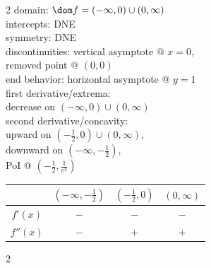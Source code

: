 \documentclass{book}
\begin{document}
\begin{appendices}
\begin{enumerate}[!HW!]
\begin{multicols}{2}
domain: $\dom f = (-\infty, 0) \cup (0, \infty)$ \\
intercepts: DNE\\
symmetry: DNE\\ 
discontinuities: vertical asymptote @ $x=0$,\\ removed point @ $(0,0)$\\
end behavior: horizontal asymptote @ $y=1$\\
first derivative/extrema:\\ decrease on $(-\infty, 0)\cup(0,\infty)$\\
second derivative/concavity:\\ upward on $\left(-\frac{1}{2}, 0\right)\cup(0,\infty)$,\\ downward on $\left(-\infty, -\frac{1}{2}\right)$,\\ PoI @ $\left(-\frac{1}{2}, \frac{1}{e^2}\right)$\vspace{-15pt}
\begin{center}
\begin{tabular}{c|c|c|c}
 & $\left(-\infty, -\frac{1}{2}\right)$ & $\left(-\frac{1}{2}, 0\right)$ & $(0,\infty)$ \\ \hline
$f'(x)$ & $-$ & $-$ & $-$ \\ 
$f''(x)$ & $-$ & $+$  & $+$ \\ 
\end{tabular}
\end{center}
\end{multicols}

\itemspade \mbox{}\vspace{-25pt}

\begin{multicols}{2}
\columnbreak
 

\end{multicols}
\end{enumerate}
\end{appendices}
\end{document}
